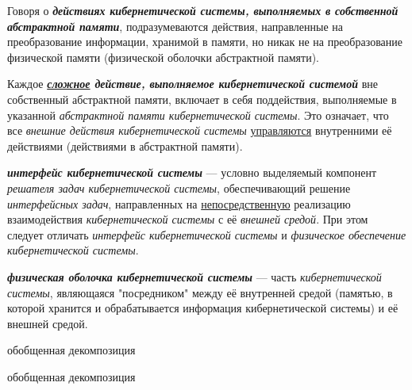 Говоря о \textbf{\textit{действиях кибернетической системы, выполняемых в собственной абстрактной памяти}}, подразумеваются действия, направленные на преобразование информации, хранимой в памяти, но никак не на преобразование физической памяти (физической оболочки абстрактной памяти).

Каждое \textbf{\textit{\uline{сложное} действие, выполняемое кибернетической системой}} вне собственный абстрактной памяти, включает в себя поддействия, выполняемые в указанной \textit{абстрактной памяти кибернетической системы}. 
Это означает, что все \textit{внешние действия кибернетической системы} \uline{управляются} внутренними её действиями (действиями в абстрактной памяти).


\textbf{\textit{интерфейс кибернетической системы}} --- условно выделяемый компонент \textit{решателя задач кибернетической системы}, обеспечивающий решение \textit{интерфейсных задач}, направленных на \uline{непосредственную} реализацию взаимодействия \textit{кибернетической системы} с её \textit{внешней средой}. При этом следует отличать \textit{интерфейс кибернетической системы} и \textit{физическое обеспечение кибернетической системы}.

\textbf{\textit{физическая оболочка кибернетической системы}} --- часть \textit{кибернетической системы}, являющаяся "посредником"{} между её внутренней средой (памятью, в которой хранится и обрабатывается информация кибернетической системы) и её внешней средой.

\begin{SCn}
	\begin{scnrelfromset}{обобщенная декомпозиция}
	\end{scnrelfromset}
\end{SCn}


\begin{SCn}
	\begin{scnrelfromset}{обобщенная декомпозиция}
	\end{scnrelfromset}
\end{SCn}

